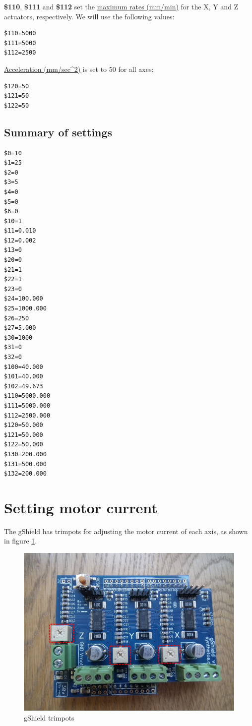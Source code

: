 \documentclass[]{book}
\theoremstyle{definition}
\theoremstyle{definition}
\theoremstyle{definition}
\theoremstyle{remark}
\begin{document}
\textbf{\$110}, \textbf{\$111} and \textbf{\$112} set the
\href{https://github.com/gnea/grbl/wiki/Grbl-v1.1-Configuration\#110-111-and-112--xyz-max-rate-mmmin}{maximum
rates (mm/min)} for the X, Y and Z actuators, respectively. We will use
the following values:

\begin{verbatim}
$110=5000
$111=5000
$112=2500
\end{verbatim}

\href{https://github.com/gnea/grbl/wiki/Grbl-v1.1-Configuration\#120-121-122--xyz-acceleration-mmsec2}{Acceleration
(mm/sec\^{}2)} is set to 50 for all axes:

\begin{verbatim}
$120=50
$121=50
$122=50
\end{verbatim}

\subsection{Summary of settings}\label{summary-of-settings}

\begin{verbatim}
$0=10
$1=25
$2=0
$3=5
$4=0
$5=0
$6=0
$10=1
$11=0.010
$12=0.002
$13=0
$20=0
$21=1
$22=1
$23=0
$24=100.000
$25=1000.000
$26=250
$27=5.000
$30=1000
$31=0
$32=0
$100=40.000
$101=40.000
$102=49.673
$110=5000.000
$111=5000.000
$112=2500.000
$120=50.000
$121=50.000
$122=50.000
$130=200.000
$131=500.000
$132=200.000
\end{verbatim}

\section{Setting motor current}\label{setting-motor-current}

The gShield has trimpots for adjusting the motor current of each axis,
as shown in figure \ref{fig:gShield}.

\begin{figure}

{\centering \includegraphics[width=0.75\linewidth]{images/gShield-trimpots} 

}

\caption{gShield trimpots}\label{fig:gShield}
\end{figure}
\end{document}
